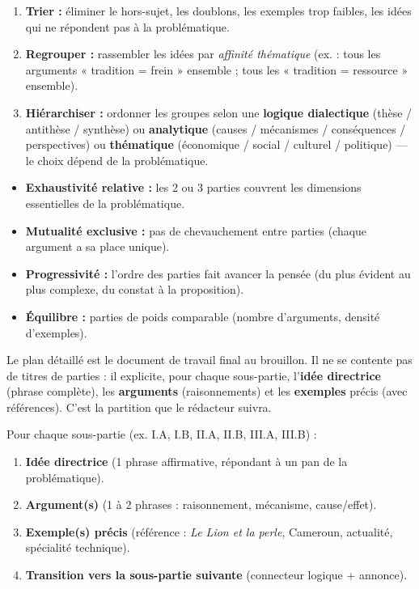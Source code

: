 \documentclass[11pt]{article}
\newcommand{\cle}[1]{{\popxbold\color{popdark}#1}}
\newcounter{popsec}
\newcounter{popsub}
\newcommand{\courssub}[1]{%
  \stepcounter{popsub}%
  \par\vspace{9pt}\noindent{\popxbold\fontsize{11.5}{13}\selectfont\color{popink}{\color{poporange}\thepopsec.\thepopsub}\hspace{6pt}#1}\par\nopagebreak\vspace{4pt}
}
\begin{document}
\begin{enumerate}
\item \textbf{Trier :} éliminer le hors-sujet, les doublons, les exemples trop faibles, les idées qui ne répondent pas à la problématique.
\item \textbf{Regrouper :} rassembler les idées par \emph{affinité thématique} (ex. : tous les arguments « tradition = frein » ensemble ; tous les « tradition = ressource » ensemble).
\item \textbf{Hiérarchiser :} ordonner les groupes selon une \textbf{logique dialectique} (thèse / antithèse / synthèse) ou \textbf{analytique} (causes / mécanismes / conséquences / perspectives) ou \textbf{thématique} (économique / social / culturel / politique) — le choix dépend de la problématique.
\end{enumerate}

\begin{propriete}
\begin{itemize}
\item \textbf{Exhaustivité relative :} les 2 ou 3 parties couvrent les dimensions essentielles de la problématique.
\item \textbf{Mutualité exclusive :} pas de chevauchement entre parties (chaque argument a sa place unique).
\item \textbf{Progressivité :} l'ordre des parties fait avancer la pensée (du plus évident au plus complexe, du constat à la proposition).
\item \textbf{Équilibre :} parties de poids comparable (nombre d'arguments, densité d'exemples).
\end{itemize}
\end{propriete}

\courssub{Étape 6 : Rédiger le plan détaillé}

Le \cle{plan détaillé} est le document de travail final au brouillon. Il ne se contente pas de titres de parties : il explicite, pour chaque sous-partie, l'\textbf{idée directrice} (phrase complète), les \textbf{arguments} (raisonnements) et les \textbf{exemples} précis (avec références). C'est la \og partition \fg que le rédacteur suivra.

\begin{methode}
Pour chaque sous-partie (ex. I.A, I.B, II.A, II.B, III.A, III.B) :
\begin{enumerate}
\item \textbf{Idée directrice} (1 phrase affirmative, répondant à un pan de la problématique).
\item \textbf{Argument(s)} (1 à 2 phrases : raisonnement, mécanisme, cause/effet).
\item \textbf{Exemple(s) précis} (référence : \emph{Le Lion et la perle}, Cameroun, actualité, spécialité technique).
\item \textbf{Transition vers la sous-partie suivante} (connecteur logique + annonce).
\end{enumerate}
\end{methode}
\end{document}
